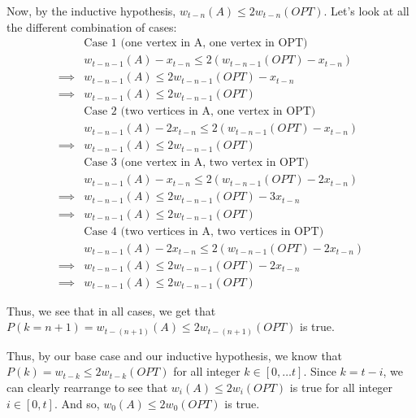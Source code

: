 \documentclass{article}
\begin{document}
Now, by the inductive hypothesis, $w_{t-n}(A) \leq 2w_{t-n}(OPT)$. Let's look at all the different combination of cases:
\begin{align*}
    &\text{Case 1 (one vertex in A, one vertex in OPT)} \\
    &w_{t-n-1}(A) - x_{t-n} \leq 2(w_{t-n-1}(OPT) - x_{t-n}) \\
    \implies &w_{t-n-1}(A) \leq 2w_{t-n-1}(OPT) - x_{t-n} \\
    \implies &w_{t-n-1}(A) \leq 2w_{t-n-1}(OPT) \\
    &\text{Case 2 (two vertices in A, one vertex in OPT)} \\
    &w_{t-n-1}(A) - 2x_{t-n} \leq 2(w_{t-n-1}(OPT) - x_{t-n}) \\
    \implies &w_{t-n-1}(A) \leq 2w_{t-n-1}(OPT) \\
    &\text{Case 3 (one vertex in A, two vertex in OPT)} \\
    &w_{t-n-1}(A) - x_{t-n} \leq 2(w_{t-n-1}(OPT) - 2x_{t-n}) \\
    \implies &w_{t-n-1}(A) \leq 2w_{t-n-1}(OPT) - 3x_{t-n} \\
    \implies &w_{t-n-1}(A) \leq 2w_{t-n-1}(OPT) \\
    &\text{Case 4 (two vertices in A, two vertices in OPT)} \\
    &w_{t-n-1}(A) - 2x_{t-n} \leq 2(w_{t-n-1}(OPT) - 2x_{t-n}) \\
    \implies &w_{t-n-1}(A) \leq 2w_{t-n-1}(OPT) - 2x_{t-n} \\
    \implies &w_{t-n-1}(A) \leq 2w_{t-n-1}(OPT)
\end{align*}

Thus, we see that in all cases, we get that $P(k=n+1) = w_{t-(n+1)}(A) \leq 2w_{t-(n+1)}(OPT)$ is true.

Thus, by our base case and our inductive hypothesis, we know that $P(k) = w_{t-k} \leq 2w_{t-k}(OPT)$ for all integer
$k \in [0, \ldots t]$. Since $k = t - i$, we can clearly rearrange to see that $w_i(A) \leq 2w_{i}(OPT)$ is true for all
integer $i \in [0, t]$. And so, $w_{0}(A) \leq 2w_{0}(OPT)$ is true.
\end{document}
